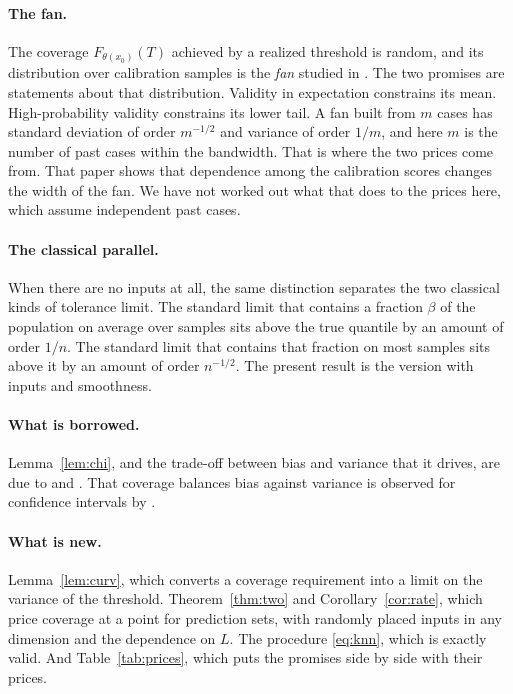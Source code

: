 \documentclass[11pt]{article}
\theoremstyle{definition}
\theoremstyle{remark}
\begin{document}
\paragraph{The fan.}
The coverage $F_{\theta(x_0)}(T)$ achieved by a realized threshold is random, and its
distribution over calibration samples is the \emph{fan} studied in \citet{cotton2026fan}. The two promises are statements about that distribution.
Validity in expectation constrains its mean. High-probability validity constrains its lower
tail. A fan built from $m$ cases has standard deviation of order $m^{-1/2}$ and variance of
order $1/m$, and here $m$ is the number of past cases within the bandwidth. That is where
the two prices come from. That paper shows that dependence among the calibration
scores changes the width of the fan. We have not worked out what that does to the prices
here, which assume independent past cases.

\paragraph{The classical parallel.}
When there are no inputs at all, the same distinction separates the two classical kinds of
tolerance limit. The standard limit that contains a fraction $\beta$ of the population on
average over samples sits above the true quantile by an amount of order $1/n$. The standard
limit that contains that fraction on most samples sits above it by an amount of order
$n^{-1/2}$. The present result is the version with inputs and smoothness.

\paragraph{What is borrowed.}
Lemma~\ref{lem:chi}, and the trade-off between bias and variance that it drives, are due to
\citet{low1995bias} and \citet{derumigny2023lower}. That coverage balances bias against
variance is observed for confidence intervals by \citet{calonico2022coverage}.

\paragraph{What is new.}
Lemma~\ref{lem:curv}, which converts a coverage requirement into a limit on the variance of
the threshold. Theorem~\ref{thm:two} and Corollary~\ref{cor:rate}, which price coverage at
a point for prediction sets, with randomly placed inputs in any dimension and the
dependence on $L$. The procedure \eqref{eq:knn}, which is exactly valid. And
Table~\ref{tab:prices}, which puts the promises side by side with their prices.
\end{document}
